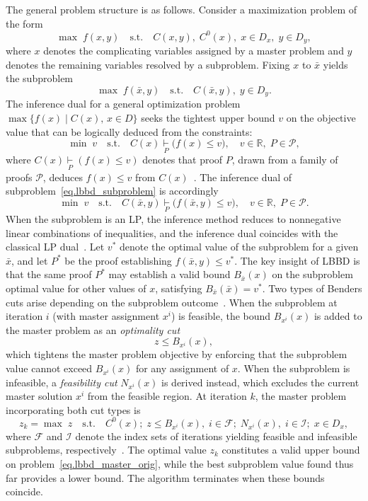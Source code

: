 The general problem structure is as follows. Consider a maximization
problem of the form
\begin{equation}
    \max\; f(x, y) \quad \text{s.t.} \quad C(x, y),\; C^0(x),\;
    x \in D_x,\; y \in D_y,
    \label{eq.lbbd_master_orig}
\end{equation}
where $x$ denotes the complicating variables assigned by a master
problem and $y$ denotes the remaining variables resolved by a
subproblem. Fixing $x$ to $\bar{x}$ yields the subproblem
\begin{equation}
    \max\; f(\bar{x}, y) \quad \text{s.t.} \quad C(\bar{x}, y),\;
    y \in D_y.
    \label{eq.lbbd_subproblem}
\end{equation}
The inference dual for a general optimization problem
$\max\{f(x) \mid C(x),\, x \in D\}$ seeks the tightest upper bound
$v$ on the objective value that can be logically deduced from the
constraints:
\[
    \min\; v \quad \text{s.t.} \quad C(x) \underset{P}{\vdash}
    \bigl(f(x) \leq v\bigr), \quad v \in \mathbb{R},\; P \in
    \mathcal{P},
\]
where $C(x) \underset{P}{\vdash} (f(x) \leq v)$ denotes that proof
$P$, drawn from a family of proofs $\mathcal{P}$, deduces
$f(x) \leq v$ from $C(x)$~\citep{Hooker2019}. The inference dual of
subproblem~\eqref{eq.lbbd_subproblem} is accordingly
\[
    \min\; v \quad \text{s.t.} \quad C(\bar{x}, y)
    \underset{P}{\vdash} \bigl(f(\bar{x}, y) \leq v\bigr), \quad
    v \in \mathbb{R},\; P \in \mathcal{P}.
\]
When the subproblem is an LP, the inference method reduces to
nonnegative linear combinations of inequalities, and the inference
dual coincides with the classical LP dual~\citep{Hooker2019}.
Let $v^*$ denote the optimal value of the subproblem for a given
$\bar{x}$, and let $P^*$ be the proof establishing
$f(\bar{x}, y) \leq v^*$. The key insight of LBBD is that the same
proof $P^*$ may establish a valid bound $B_{\bar{x}}(x)$ on the
subproblem optimal value for other values of $x$, satisfying
$B_{\bar{x}}(\bar{x}) = v^*$. Two types of Benders cuts arise
depending on the subproblem outcome~\citep{Hooker2019}. When the
subproblem at iteration $i$ (with master assignment $x^i$) is feasible,
the bound $B_{x^i}(x)$ is added to the master problem as an
\textit{optimality cut}
\[
    z \leq B_{x^i}(x),
\]
which tightens the master problem objective by enforcing that the
subproblem value cannot exceed $B_{x^i}(x)$ for any assignment
of $x$. When the subproblem is infeasible, a \textit{feasibility cut}
$N_{x^i}(x)$ is derived instead, which excludes the current master
solution $x^i$ from the feasible region. At iteration $k$, the
master problem incorporating both cut types is
\[
    z_k = \max\; z \quad \text{s.t.} \quad C^0(x);\;
    z \leq B_{x^i}(x),\; i \in \mathcal{F};\;
    N_{x^i}(x),\; i \in \mathcal{I};\;
    x \in D_x,
\]
where $\mathcal{F}$ and $\mathcal{I}$ denote the index sets of
iterations yielding feasible and infeasible subproblems,
respectively~\citep{Hooker2019}. The optimal value $z_k$ constitutes
a valid upper bound on problem~\eqref{eq.lbbd_master_orig}, while the
best subproblem value found thus far provides a lower bound. The
algorithm terminates when these bounds coincide.

